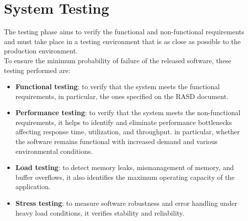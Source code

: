 \section{System Testing}
The testing phase aims to verify the functional and non-functional requirements and must take place in a testing environment that is as close as possible to the production environment.\\
To ensure the minimum probability of failure of the released software, these testing performed are:
\begin{itemize}
    \item \textbf{Functional testing}: to verify that the system meets the functional requirements, in particular, the ones specified on the RASD document.
    \item \textbf{Performance testing}: to verify that the system meets the non-functional requirements, it helps to identify and eliminate performance bottlenecks affecting response time, utilization, and throughput. in particular, whether the software remains functional with increased demand and various environmental conditions.
    \item \textbf{Load testing}: to detect memory leaks, mismanagement of memory, and buffer overflows, it also identifies the maximum operating capacity of the application.
    \item \textbf{Stress testing}: to measure software robustness and error handling under heavy load conditions, it verifies stability and reliability.
\end{itemize}